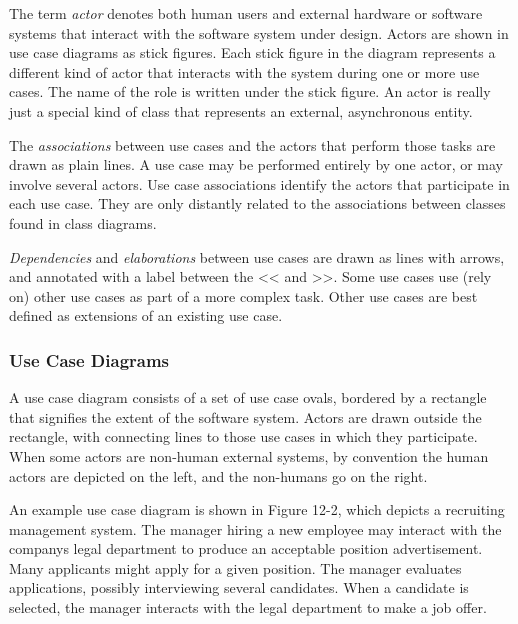 The term \textit{actor} denotes both human users and
external hardware or software systems that interact with the software
system under design. Actors are shown in use case diagrams as stick
figures. Each stick figure in the diagram represents a different kind
of actor that interacts with the system during one or more use cases.
The name of the role is written under the stick figure. An
actor is really just a special kind of class that represents an
external, asynchronous entity.

The \textit{association}\textit{s} between use cases
and the actors that perform those tasks are drawn as plain lines. A use
case may be performed entirely by one actor, or may involve several
actors. Use case associations identify the actors that participate in
each use case. They are only distantly related to the associations
between classes found in class diagrams.

\textit{Dependencies} and
\textit{elaboration}\textit{s} between use cases are
drawn as lines with arrows, and annotated with a label between the
{\textless}{\textless} and {\textgreater}{\textgreater}. Some use cases
use (rely on) other use cases as part of a more complex task. Other use
cases are best defined as extensions of an existing use case.

\subsubsection[Use Case Diagrams]{Use Case Diagrams}
A use case diagram consists of a set of use case ovals, bordered by a
rectangle that signifies the extent of the software system. Actors are
drawn outside the rectangle, with connecting lines to those use cases
in which they participate. When some actors are non-human external
systems, by convention the human actors are depicted on the left, and
the non-humans go on the right.

An example use case diagram is shown in Figure 12-2, which depicts a
recruiting management system. The manager hiring a new employee may
interact with the company{\textquotesingle}s legal department to
produce an acceptable position advertisement. Many applicants might
apply for a given position. The manager evaluates applications,
possibly interviewing several candidates. When a candidate is selected,
the manager interacts with the legal department to make a job offer.

\bigskip

